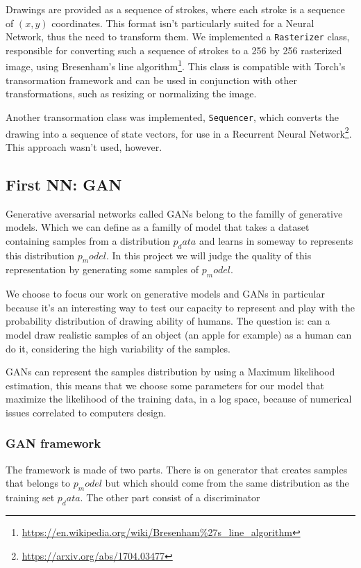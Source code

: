 \documentclass[
  10pt, 
  a4paper,
  oneside, 
  headinclude, 
  footinclude, 
  BCOR5mm, 
]{scrartcl}
\begin{document}
Drawings are provided as a sequence of strokes, where each stroke is a sequence
of $(x, y)$ coordinates. This format isn't particularly suited for a Neural
Network, thus the need to transform them. We implemented a \texttt{Rasterizer}
class, responsible for converting such a sequence of strokes to a 256 by 256
rasterized image, using Bresenham's line
algorithm\footnote{\url{https://en.wikipedia.org/wiki/Bresenham\%27s_line_algorithm}}.
This class is compatible with Torch's transormation framework and can be used in
conjunction with other transformations, such as resizing or normalizing the image.

Another transormation class was implemented, \texttt{Sequencer}, which converts
the drawing into a sequence of state vectors, for use in a Recurrent Neural
Network\footnote{\url{https://arxiv.org/abs/1704.03477}}. This approach wasn't
used, however.

\subsection{First NN: GAN}

Generative aversarial networks called GANs belong to the familly of generative models. Which we can define as a familly of model that takes a dataset containing samples from a distribution $p_data$ and learns in someway to represents this distribution $p_model$. In this project we will judge the quality of this representation by generating some samples of $p_model$.

We choose to focus our work on generative models and GANs in particular because it's an interesting way to test our capacity to represent and play with the probability distribution of drawing ability of humans. The question is: can a model draw realistic samples of an object (an apple for example) as a human can do it, considering the high variability of the samples.

GANs can represent the samples distribution by using a Maximum likelihood estimation, this means that we choose some parameters for our model that maximize the likelihood of the training data, in a log space, because of numerical issues correlated to computers design.

\subsubsection{GAN framework}
The framework is made of two parts. There is on generator that creates samples that belongs to $p_model$ but which should come from the same distribution as the training set $p_data$. The other part consist of a discriminator 
\end{document}
